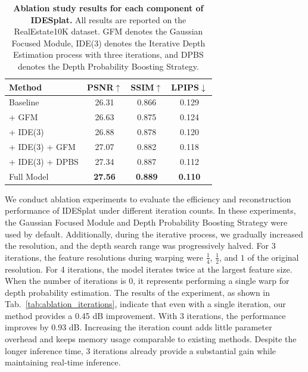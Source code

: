 \begin{table}
\small
\centering
    \caption{\textbf{Ablation study results for each component of IDESplat.} All results are reported on the RealEstate10K dataset. GFM denotes the Gaussian Focused Module, IDE(3) denotes the Iterative Depth Estimation process with three iterations, and DPBS denotes the Depth Probability Boosting Strategy.}
    \vspace{-2mm}
    \setlength{\tabcolsep}{10pt} %
    \begin{tabular}{l|ccc}
        \toprule
        Method & PSNR$\uparrow$ & SSIM$\uparrow$ & LPIPS$\downarrow$ \\
        \midrule
        Baseline            & 26.31   & 0.866   & 0.129  \\
        \midrule
         + GFM              & 26.63   & 0.875  & 0.124 \\
         + IDE(3)           & 26.88   & 0.878  & 0.120 \\
         + IDE(3) + GFM     & 27.07   & 0.882  & 0.118 \\
         + IDE(3) + DPBS     & 27.34   & 0.887  & 0.112 \\
         Full Model         & \textbf{27.56}   & \textbf{0.889}  & \textbf{0.110} \\
        \bottomrule
    \end{tabular}
    \label{tab:ablation_module}
    \vspace{-6mm}
\end{table}

We conduct ablation experiments to evaluate the efficiency and reconstruction performance of IDESplat under different iteration counts.
%
In these experiments, the Gaussian Focused Module and Depth Probability Boosting Strategy were used by default.
%
Additionally, during the iterative process, we gradually increased the resolution, and the depth search range was progressively halved. For 3 iterations, the feature resolutions during warping were $\frac{1}{4}$, $\frac{1}{2}$, and $1$ of the original resolution.
%
For 4 iterations, the model iterates twice at the largest feature size. When the number of iterations is 0, it represents performing a single warp for depth probability estimation.
%
The results of the experiment, as shown in Tab.~\ref{tab:ablation_iterations}, indicate that even with a single iteration, our method provides a 0.45 dB improvement.
%
With 3 iterations, the performance improves by 0.93 dB. Increasing the iteration count adds little parameter overhead and keeps memory usage comparable to existing methods. Despite the longer inference time, 3 iterations already provide a substantial gain while maintaining real-time inference.







